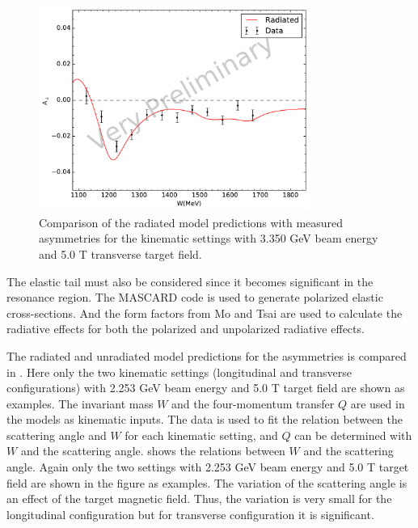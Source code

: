 \begin{figure}[tb!]
  \centering
  \includegraphics[width=0.79\textwidth]{figs/asymmetry-data-model-33505090.pdf}
  \caption[Asymmetries with $E=3.350$ GeV and $B=5.0$ T.]{Comparison of the radiated model predictions with measured asymmetries for the kinematic settings with 3.350 GeV beam energy and 5.0 T transverse target field. \label{C8S2F6}}
\end{figure}

The elastic tail must also be considered since it becomes significant in the resonance region. The MASCARD code \cite{Afanasev2001} is used to generate polarized elastic cross-sections. And the form factors from Mo and Tsai are used to calculate the radiative effects for both the polarized and unpolarized radiative effects.

The radiated and unradiated model predictions for the asymmetries is compared in . Here only the two kinematic settings (longitudinal and transverse configurations) with 2.253 GeV beam energy and 5.0 T target field are shown as examples. The invariant mass $W$ and the four-momentum transfer $Q$ are used in the models as kinematic inputs. The data is used to fit the relation between the scattering angle and $W$ for each kinematic setting, and $Q$ can be determined with $W$ and the scattering angle.  shows the relations between $W$ and the scattering angle. Again only the two settings with 2.253 GeV beam energy and 5.0 T target field are shown in the figure as examples. The variation of the scattering angle is an effect of the target magnetic field. Thus, the variation is very small for the longitudinal configuration but for transverse configuration it is significant.

